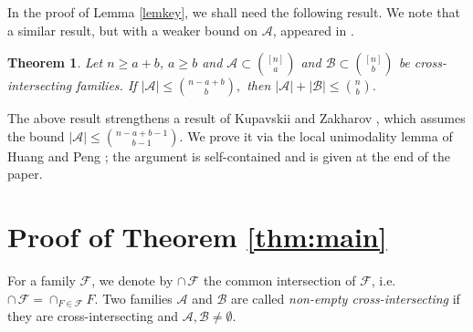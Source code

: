 \documentclass[11pt]{article}
\def\marrow{{\boldmath {\marginpar[\hfill$\rightarrow \rightarrow$]{$\leftarrow \leftarrow$}}}}
\def\andrey#1{{\sc Andrey: }{\marrow\sf \textcolor{blue}{#1}}}
\newcommand{\m}{\mathcal}
\def\yang#1{{\sc Yang: }{\marrow\sf \textcolor{cyan}{#1}}}
\newtheorem{theorem}{Theorem}[section]
\begin{document}
In the proof of Lemma \ref{lemkey}, we shall need the following result. We note that a similar result, but with a weaker bound on $\m A$, appeared in \cite{KZ2018}.



\begin{theorem}\label{10-12-1}
Let $n\ge a+b$, $a\ge b$ and $\mathcal{A}\subset {[n]\choose a}$ and $\mathcal{B}\subset {[n]\choose b}$ be cross-intersecting families. If
$|\mathcal{A}|\leq {n-a+b \choose b},$
then
$|\mathcal{A}|+|\mathcal{B}|\leq {n \choose b}.$
\end{theorem}
The above result strengthens a result of Kupavskii and Zakharov \cite{KZ2018}, which assumes the bound $|\mathcal{A}|\leq {n-a+b-1 \choose b-1}$. We prove it via the local unimodality lemma of Huang and Peng \cite{12-3-1}; the argument is self-contained and is given at the end of the paper.


\section{Proof of Theorem \ref{thm:main}}\label{secmain}

For a family $\m F$, we denote by $\cap\, \m F$ the common intersection of $\m F$, i.e. $\cap\,\m F=\cap_{F\in \m F}F$.
Two families $\mathcal{A}$ and $\mathcal{B}$ are called {\it non-empty cross-intersecting} if they are cross-intersecting and $\mathcal{A}, \mathcal{B} \neq \emptyset$.
\end{document}
